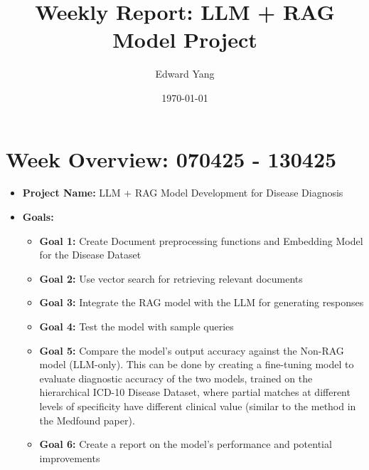 \documentclass[12pt]{article}
\title{Weekly Report: LLM + RAG Model Project}
\author{Edward Yang}
\date{\today}
\begin{document}
\maketitle

\section*{Week Overview: 070425 - 130425}
\begin{itemize}
    \item \textbf{Project Name:} LLM + RAG Model Development for Disease Diagnosis
    \item \textbf{Goals:}
    \begin{itemize}[leftmargin=*]
        \item \textbf{Goal 1:} Create Document preprocessing functions and Embedding Model for the Disease Dataset
        \item \textbf{Goal 2:} Use vector search for retrieving relevant documents
        \item \textbf{Goal 3:} Integrate the RAG model with the LLM for generating responses
        \item \textbf{Goal 4:} Test the model with sample queries
        \item \textbf{Goal 5:} Compare the model's output accuracy against the Non-RAG model (LLM-only). This can be done by creating a fine-tuning model to evaluate diagnostic accuracy of the two models, trained on the hierarchical ICD-10 Disease Dataset, where partial matches at different levels of specificity have different clinical value (similar to the method in the Medfound paper).
        \item \textbf{Goal 6:} Create a report on the model's performance and potential improvements
    \end{itemize}
\end{itemize}
\end{document}
